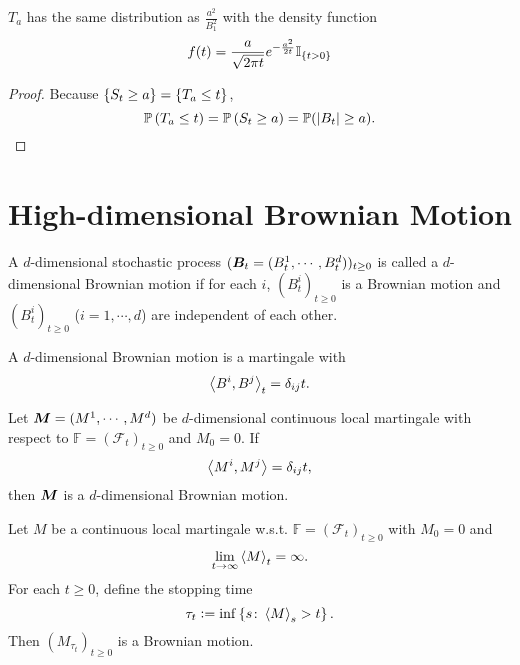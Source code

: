 \begin{cor}
    $T_a$ has the same distribution as $\frac{a^2}{B_1^2}$ with the density function
    \begin{equation*}
        f(t) = \frac{a}{\sqrt{2\pi t}}e^{-\frac{a^2}{2t}}\mathbb{I}_{\left\{t > 0\right\}}
    \end{equation*}
\end{cor}
\begin{proof}
    Because $\left\{S_t \geq a\right\} = \left\{T_a \leq t\right\}$,
    \begin{equation*}
        \mathbb{P}\left(T_a \leq t\right) = \mathbb{P}\left(S_t \geq a\right) = \mathbb{P}(\left\lvert B_t\right\lvert \geq a). \qedhere
    \end{equation*}
\end{proof}

\section{High-dimensional Brownian Motion}

\begin{defn}
    A $d$-dimensional stochastic process $(\boldsymbol{B}_t = (B^1_t,\cdots,B^d_t))_{t \geq 0}$ is called a $d$-dimensional Brownian motion if for each $i$, $(B^i_t)_{t \geq 0}$ is a Brownian motion and $(B^i_t)_{t \geq 0}$ ($i=1,\cdots,d$) are independent of each other.
\end{defn}
\begin{rmk}
    A $d$-dimensional Brownian motion is a martingale with
    \begin{equation*}
        \left\langle B^i,B^j \right\rangle_t = \delta_{ij} t.
    \end{equation*}
\end{rmk}

\begin{thm}
    Let $\boldsymbol{M} = (M^1,\cdots,M^d)$ be $d$-dimensional continuous local martingale with respect to $\mathbb{F}=(\mathcal{F}_t)_{t\geq 0}$ and $M_0 = 0$. If 
    \begin{equation*}
        \left\langle M^i,M^j \right\rangle = \delta_{ij}t,
    \end{equation*}
    then $\boldsymbol{M}$ is a $d$-dimensional Brownian motion.
\end{thm}

\begin{thm}
    Let $M$ be a continuous local martingale w.s.t. $\mathbb{F}=(\mathcal{F}_t)_{t\geq 0}$ with $M_0 = 0$ and
    \begin{equation*}
        \lim_{t \rightarrow \infty} \left\langle M \right\rangle_t = \infty.
    \end{equation*}
    For each $t \geq 0 $, define the stopping time
    \begin{equation*}
        \tau_t \vcentcolon= \inf\left\{s \colon \left\langle M \right\rangle_s > t\right\}.
    \end{equation*}
    Then $(M_{\tau_t})_{t \geq 0}$ is a Brownian motion.
\end{thm}

